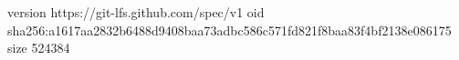 version https://git-lfs.github.com/spec/v1
oid sha256:a1617aa2832b6488d9408baa73adbc586c571fd821f8baa83f4bf2138e086175
size 524384
